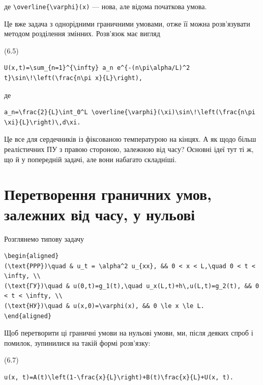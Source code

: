 \documentclass[
  ukrainian,
]{article}
\begin{document}
де \texttt{\textbackslash{}overline\{\textbackslash{}varphi\}(x)} ---
нова, але відома початкова умова.

Це вже задача з однорідними граничними умовами, отже її можна
розв'язувати методом розділення змінних. Розв'язок має вигляд

(6.5)

\begin{verbatim}
U(x,t)=\sum_{n=1}^{\infty} a_n e^{-(n\pi\alpha/L)^2 t}\sin\!\left(\frac{n\pi x}{L}\right),
\end{verbatim}

де

\begin{verbatim}
a_n=\frac{2}{L}\int_0^L \overline{\varphi}(\xi)\sin\!\left(\frac{n\pi \xi}{L}\right)\,d\xi.
\end{verbatim}

Це все для сердечників із фіксованою температурою на кінцях. А як щодо
більш реалістичних ПУ з правою стороною, залежною від часу? Основні ідеї
тут ті ж, що й у попередній задачі, але вони набагато складніші.

\section{Перетворення граничних умов, залежних від часу, у
нульові}\label{ux43fux435ux440ux435ux442ux432ux43eux440ux435ux43dux43dux44f-ux433ux440ux430ux43dux438ux447ux43dux438ux445-ux443ux43cux43eux432-ux437ux430ux43bux435ux436ux43dux438ux445-ux432ux456ux434-ux447ux430ux441ux443-ux443-ux43dux443ux43bux44cux43eux432ux456}

Розглянемо типову задачу

\begin{verbatim}
\begin{aligned}
(\text{PPP})\quad & u_t = \alpha^2 u_{xx}, && 0 < x < L,\quad 0 < t < \infty, \\
(\text{ГУ})\quad & u(0,t)=g_1(t),\quad u_x(L,t)+h\,u(L,t)=g_2(t), && 0 < t < \infty, \\
(\text{НУ})\quad & u(x,0)=\varphi(x), && 0 \le x \le L.
\end{aligned}
\end{verbatim}

Щоб перетворити ці граничні умови на нульові умови, ми, після деяких
спроб і помилок, зупинилися на такій формі розв'язку:

(6.7)

\begin{verbatim}
u(x, t)=A(t)\left(1-\frac{x}{L}\right)+B(t)\frac{x}{L}+U(x, t).
\end{verbatim}
\end{document}
